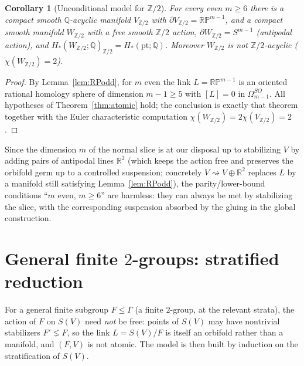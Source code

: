 \documentclass[12pt]{article}
\newtheorem{corollary}[theorem]{Corollary}
\theoremstyle{definition}
\begin{document}
\begin{corollary}[Unconditional model for $\mathbb{Z}/2$]\label{cor:Z2}
For every even $m\ge6$ there is a compact smooth $\mathbb{Q}$-acyclic manifold
$V_{\mathbb{Z}/2}$ with $\partial V_{\mathbb{Z}/2}=\mathbb{RP}^{m-1}$, and a
compact smooth manifold $W_{\mathbb{Z}/2}$ with a free smooth $\mathbb{Z}/2$
action, $\partial W_{\mathbb{Z}/2}=S^{m-1}$ (antipodal action), and
$H_*(W_{\mathbb{Z}/2};\mathbb{Q})_{\mathbb{Z}/2}=H_*(\mathrm{pt};\mathbb{Q})$.
Moreover $W_{\mathbb{Z}/2}$ is \emph{not} $\mathbb{Z}/2$-acyclic
($\chi(W_{\mathbb{Z}/2})=2$).
\end{corollary}
\begin{proof}
By Lemma~\ref{lem:RPodd}, for $m$ even the link $L=\mathbb{RP}^{m-1}$ is an
oriented rational homology sphere of dimension $m-1\ge5$ with $[L]=0$ in
$\Omega^{SO}_{m-1}$. All hypotheses of Theorem~\ref{thm:atomic} hold; the
conclusion is exactly that theorem together with the Euler characteristic
computation $\chi(W_{\mathbb{Z}/2})=2\chi(V_{\mathbb{Z}/2})=2$.
\end{proof}

Since the dimension $m$ of the normal slice is at our disposal up to stabilizing
$V$ by adding pairs of antipodal lines $\mathbb{R}^2$ (which keeps the action
free and preserves the orbifold germ up to a controlled suspension; concretely
$V\rightsquigarrow V\oplus\mathbb{R}^2$ replaces $L$ by a manifold still
satisfying Lemma~\ref{lem:RPodd}), the parity/lower-bound conditions ``$m$ even,
$m\ge6$'' are harmless: they can always be met by stabilizing the slice, with
the corresponding suspension absorbed by the gluing in the global construction.

\section{General finite $2$-groups: stratified reduction}\label{sec:induct}

For a general finite subgroup $F\le\Gamma$ (a finite $2$-group, at the
relevant strata), the action of $F$ on $S(V)$ need \emph{not} be free: points of
$S(V)$ may have nontrivial stabilizers $F'\lneq F$, so the link
$L=S(V)/F$ is itself an orbifold rather than a manifold, and $(F,V)$ is not
atomic. The model is then built by induction on the stratification of $S(V)$.
\end{document}
